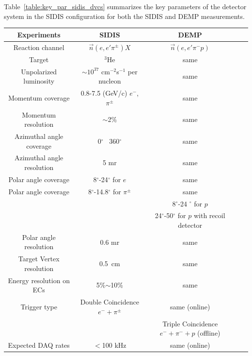 Table~\ref{table:key_par_sidis_dvcs} summarizes the key parameters of the
detector system in the SIDIS configuration for both the SIDIS and DEMP
measurements.
\begin{table}\centering
\begin{tabular}{|c|c|c|c|c|}
\hline
Experiments                & SIDIS                    & DEMP  \\\hline
Reaction channel           & $\vec{n}(e,e'\pi^{\pm})X$ & $\vec{n}(e,e'\pi^{-}p)$	\\\hline
Target                     & $^3$He                   &same 	\\\hline
Unpolarized luminosity     & $\sim10^{37}$ cm$^{-2}$s$^{-1}$ per nucleon & same	\\\hline 
Momentum coverage          & 0.8-7.5 (GeV/c)  $e^-$,$\pi^{\pm}$           &same 	\\\hline
Momentum resolution        & $\sim$2\%                & same\\\hline
Azimuthal angle coverage   & 0$^{\circ}$ ~360$^{\circ}$ & same	\\\hline
Azimuthal angle resolution & 5 mr                     & same	\\\hline
Polar angle coverage       & 8$^{\circ}$-24$^{\circ}$ for $e$ &  same \\\hline
Polar angle coverage       & 8$^{\circ}$-14.8$^{\circ}$ for $\pi^{\pm}$  &  same 	\\\hline
                           &                          & 8$^{\circ}$-24 $^{\circ}$ for $p$ \\\hline
                           &                          & 24$^{\circ}$-50$^{\circ}$ for $p$ with recoil detector         \\\hline
Polar angle resolution     & 0.6 mr                   & same	\\\hline
Target Vertex resolution   & 0.5~cm                   & same \\\hline
 Energy resolution on ECs  & 5\%$\sim$10\%            & same   \\\hline
Trigger type               & Double Coincidence $e^-+\pi^{\pm}$ & same (online)\\\hline
              &  & Triple Coincidence $e^-+\pi^{-}+p$ (offline)\\\hline

Expected DAQ rates         &  $<$100 kHz              &  same (online)\\\hline


\end{tabular}
\end{table}
